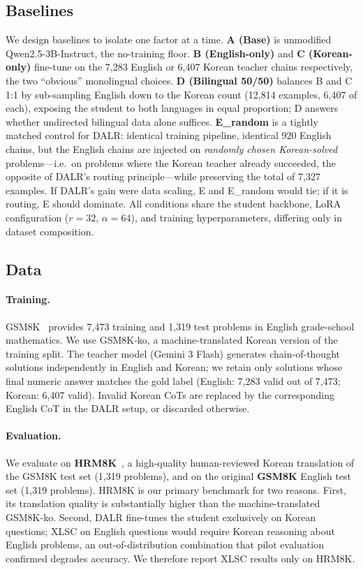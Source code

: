 \documentclass{article}
\begin{document}
\subsection{Baselines}
\label{sec:baselines}
We design baselines to isolate one factor at a time.
\textbf{A (Base)} is unmodified Qwen2.5-3B-Instruct, the no-training
floor. \textbf{B (English-only)} and \textbf{C (Korean-only)}
fine-tune on the 7,283 English or 6,407 Korean teacher chains
respectively, the two ``obvious'' monolingual choices.
\textbf{D (Bilingual 50/50)} balances B and C 1:1 by sub-sampling
English down to the Korean count (12,814 examples, 6,407 of each),
exposing the student to both languages in equal proportion; D
answers whether undirected bilingual data alone suffices.
\textbf{E\_random} is a tightly matched control for DALR: identical
training pipeline, identical 920 English chains, but the English
chains are injected on \emph{randomly chosen Korean-solved}
problems---i.e.\ on problems where the Korean teacher already
succeeded, the opposite of DALR's routing principle---while
preserving the total of 7,327 examples. If DALR's gain were data
scaling, E and E\_random would tie; if it is routing, E should
dominate. All conditions share the student backbone, LoRA
configuration ($r=32$, $\alpha=64$), and training hyperparameters,
differing only in dataset composition.

\subsection{Data}
\paragraph{Training.}
GSM8K~\citep{cobbe2021gsm8k} provides 7,473 training and 1,319 test
problems in English grade-school mathematics. We use GSM8K-ko, a
machine-translated Korean version of the training split. The teacher
model (Gemini 3 Flash) generates chain-of-thought solutions
independently in English and Korean; we retain only solutions whose
final numeric answer matches the gold label (English: 7,283 valid
out of 7,473; Korean: 6,407 valid). Invalid Korean CoTs are replaced
by the corresponding English CoT in the DALR setup, or discarded
otherwise.

\paragraph{Evaluation.}
We evaluate on \textbf{HRM8K}~\citep{ko2025hrm8k}, a high-quality
human-reviewed Korean translation of the GSM8K test set (1,319
problems), and on the original \textbf{GSM8K} English test set
(1,319 problems). HRM8K is our primary benchmark for two reasons.
First, its translation quality is substantially higher than the
machine-translated GSM8K-ko. Second, DALR fine-tunes the student
exclusively on Korean questions; XLSC on English questions would
require Korean reasoning about English problems, an
out-of-distribution combination that pilot evaluation confirmed
degrades accuracy. We therefore report XLSC results only on HRM8K.
\end{document}
